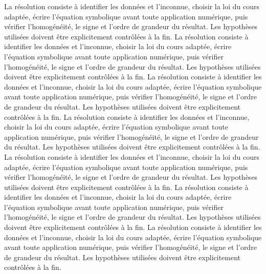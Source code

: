 \begin{corrigebox}[Corrigé]
La résolution consiste à identifier les données et l'inconnue, choisir la loi du cours adaptée, écrire l'équation symbolique avant toute application numérique, puis vérifier l'homogénéité, le signe et l'ordre de grandeur du résultat. Les hypothèses utilisées doivent être explicitement contrôlées à la fin.
La résolution consiste à identifier les données et l'inconnue, choisir la loi du cours adaptée, écrire l'équation symbolique avant toute application numérique, puis vérifier l'homogénéité, le signe et l'ordre de grandeur du résultat. Les hypothèses utilisées doivent être explicitement contrôlées à la fin.
La résolution consiste à identifier les données et l'inconnue, choisir la loi du cours adaptée, écrire l'équation symbolique avant toute application numérique, puis vérifier l'homogénéité, le signe et l'ordre de grandeur du résultat. Les hypothèses utilisées doivent être explicitement contrôlées à la fin.
La résolution consiste à identifier les données et l'inconnue, choisir la loi du cours adaptée, écrire l'équation symbolique avant toute application numérique, puis vérifier l'homogénéité, le signe et l'ordre de grandeur du résultat. Les hypothèses utilisées doivent être explicitement contrôlées à la fin.
La résolution consiste à identifier les données et l'inconnue, choisir la loi du cours adaptée, écrire l'équation symbolique avant toute application numérique, puis vérifier l'homogénéité, le signe et l'ordre de grandeur du résultat. Les hypothèses utilisées doivent être explicitement contrôlées à la fin.
La résolution consiste à identifier les données et l'inconnue, choisir la loi du cours adaptée, écrire l'équation symbolique avant toute application numérique, puis vérifier l'homogénéité, le signe et l'ordre de grandeur du résultat. Les hypothèses utilisées doivent être explicitement contrôlées à la fin.
La résolution consiste à identifier les données et l'inconnue, choisir la loi du cours adaptée, écrire l'équation symbolique avant toute application numérique, puis vérifier l'homogénéité, le signe et l'ordre de grandeur du résultat. Les hypothèses utilisées doivent être explicitement contrôlées à la fin.
\end{corrigebox}
